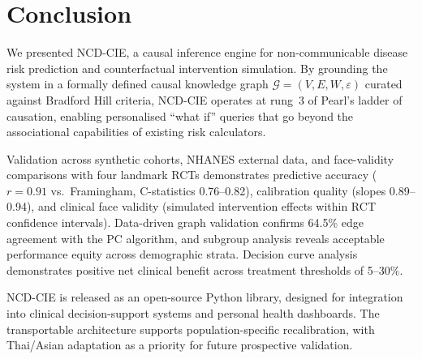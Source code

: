 \documentclass[runningheads]{llncs}
\begin{document}
\section{Conclusion}\label{sec:conclusion}

We presented NCD-CIE, a causal inference engine for non-communicable
disease risk prediction and counterfactual intervention simulation.
By grounding the system in a formally defined causal knowledge graph
$\mathcal{G} = (V, E, W, \varepsilon)$ curated against Bradford Hill
criteria, NCD-CIE operates at rung~3 of Pearl's ladder of causation,
enabling personalised ``what if'' queries that go beyond the
associational capabilities of existing risk calculators.

Validation across synthetic cohorts, NHANES external data, and
face-validity comparisons with four landmark RCTs demonstrates
predictive accuracy ($r = 0.91$ vs.\ Framingham, C-statistics
0.76--0.82), calibration quality (slopes 0.89--0.94), and clinical
face validity (simulated intervention effects within RCT confidence
intervals).  Data-driven graph validation confirms 64.5\% edge
agreement with the PC algorithm, and subgroup analysis reveals
acceptable performance equity across demographic strata.  Decision
curve analysis demonstrates positive net clinical benefit across
treatment thresholds of 5--30\%.

NCD-CIE is released as an open-source Python library, designed for
integration into clinical decision-support systems and personal
health dashboards.  The transportable architecture supports
population-specific recalibration, with Thai/Asian adaptation as a
priority for future prospective validation.
\end{document}
